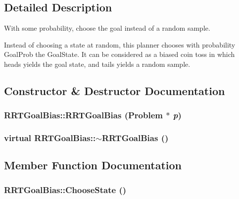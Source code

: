 \subsection{Detailed Description}
With some probability, choose the goal instead of a random sample.

Instead of choosing a state at random, this planner chooses with probability Goal\-Prob the Goal\-State. It can be considered as a  biased coin toss in which heads yields the goal state, and tails yields a random sample. 



\subsection{Constructor \& Destructor Documentation}
\subsubsection{\setlength{\rightskip}{0pt plus 5cm}RRTGoal\-Bias::RRTGoal\-Bias ({\bf Problem} $\ast$ {\em p})}\label{classRRTGoalBias_a0}


\subsubsection{\setlength{\rightskip}{0pt plus 5cm}virtual RRTGoal\-Bias::$\sim$RRTGoal\-Bias ()\hspace{0.3cm}{\tt  [inline, virtual]}}\label{classRRTGoalBias_a1}




\subsection{Member Function Documentation}
\subsubsection{ RRTGoal\-Bias::Choose\-State ()\hspace{0.3cm}{\tt  [protected, virtual]}}\label{classRRTGoalBias_b0}


